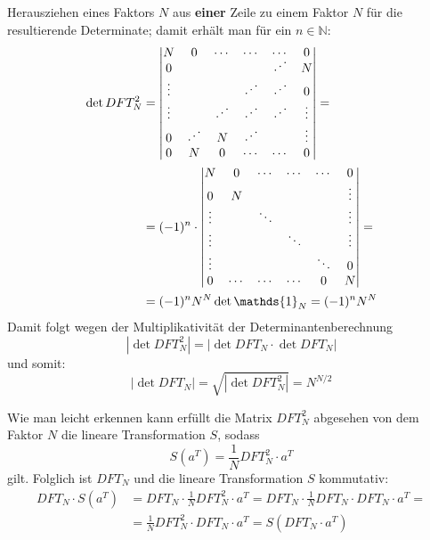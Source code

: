 \begin{flushenum}
	Herausziehen eines Faktors $N$ aus {\bf einer} Zeile zu einem Faktor $N$ für die
	resultierende Determinate; damit erhält man für ein $n \in \mathbb{N}$:
	\begin{equation*}
	\begin{split}
	\det DFT_N^2 &= \begin{vmatrix}
		N      & 0      & \cdots & \cdots & \cdots & 0      \\
		0      &        &        &        & \Ddots & N      \\
		\vdots &        &        & \Ddots & \Ddots & 0      \\
		\vdots &        & \Ddots & \Ddots & \Ddots & \vdots \\
		0      & \Ddots & N      & \Ddots &        & \vdots \\
		0      & N      & 0      & \cdots & \cdots & 0      \\
	\end{vmatrix} = \\
	& =  (-1)^n \cdot \begin{vmatrix}
		N      & 0      & \cdots & \cdots & \cdots & 0      \\
		0      & N      &        &        &        & \vdots \\
		\vdots &       & \ddots &        &        & \vdots \\
		\vdots &        &        & \ddots &        & \vdots \\
		\vdots &        &        &        & \ddots & 0      \\
		0      & \cdots & \cdots & \cdots & 0      & N      \\
	\end{vmatrix} = \\
	&= (-1)^n N^N \det \mathds{1}_N = (-1)^n N^N \\
	\end{split}
	\end{equation*}
	Damit folgt wegen der Multiplikativität der Determinantenberechnung
	\[ | \det DFT_N^2 | = |\det DFT_N \cdot \det DFT_N| \]
	und somit:
	\[ | \det DFT_N | = \sqrt{|\det DFT_N^2|} = N^{N/2} \]

	\item Wie man leicht erkennen kann erfüllt die Matrix $DFT_N^2$ abgesehen von dem
	Faktor $N$ die lineare Transformation $S$, sodass
	\[ S(a^T) = \frac{1}{N} DFT_N^2 \cdot a^T \]
	gilt.
	Folglich ist $DFT_N$ und die lineare Transformation $S$ kommutativ:
	\begin{equation*}
	\begin{split}
	DFT_N \cdot S(a^T) &= DFT_N \cdot \frac{1}{N}DFT_N^2 \cdot a^T = DFT_N \cdot \frac{1}{N} DFT_N \cdot DFT_N \cdot a^T = \\
	&= \frac{1}{N}DFT_N^2 \cdot DFT_N \cdot a^T = S(DFT_N \cdot a^T)
	\end{split}
	\end{equation*}


\end{flushenum}
